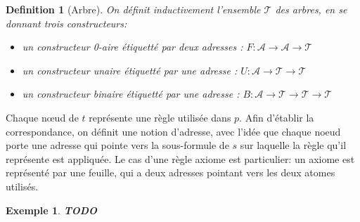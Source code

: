\documentclass[11pt,a4paper]{article}
\newtheorem{example}{Exemple}
\newtheorem{definition}{Definition}
\newcommand*{\trees}{\ensuremath{\mathcal{T}}}
\newcommand*{\todo}{{\normalfont \textbf{TODO}} }
\begin{document}
\begin{definition}[Arbre]
On définit inductivement l'ensemble \trees{} des arbres, en se donnant trois constructeurs:
\begin{itemize}
  \item un constructeur 0-aire étiquetté par deux adresses : $F: \mathcal{A} \rightarrow \mathcal{A} \rightarrow \trees$
  \item un constructeur unaire étiquetté par une adresse : $U: \mathcal{A} \rightarrow \trees \rightarrow \trees$
  \item un constructeur binaire étiquetté par une adresse : $B: \mathcal{A} \rightarrow \trees \rightarrow \trees \rightarrow \trees$
\end{itemize}
\end{definition}

Chaque n\oe ud de $t$ représente une règle utilisée dans $p$. Afin d'établir la correspondance, on définit une notion d'adresse, avec l'idée que chaque noeud porte une adresse qui pointe vers la sous-formule de $s$ sur laquelle la règle qu'il représente est appliquée. Le cas d'une règle axiome est particulier: un axiome est représenté par une feuille, qui a deux adresses pointant vers les deux atomes utilisés.

\begin{example}
  \todo
\end{example}
\end{document}
